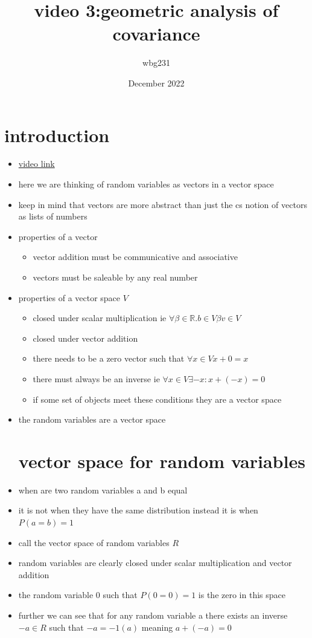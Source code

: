 \documentclass{article}
\title{video 3:geometric analysis of covariance }
\author{wbg231 }
\date{December 2022}
\begin{document}
\maketitle

\section{introduction}
\begin{itemize}
\item\href{https://www.youtube.com/watch?v=-sIvLCXcliE&t=298s}{video link}
\item here we are thinking of random variables as vectors in a vector space
\item keep in mind that vectors are more abstract than just the cs notion of vectors as lists of numbers
\item properties of a vector
\begin{itemize}
    \item vector addition must be communicative and associative
    \item vectors must be saleable by any real number
\end{itemize}
\item properties of a vector space $V$
\begin{itemize}
    \item closed under scalar multiplication ie $\forall \beta \in \mathbb{R}. b\in V \beta v\in V$
    \item closed under vector addition 
    \item there needs to be a zero vector such that $\forall x\in V x+0=x$
    \item there must always be an inverse ie $\forall x \in V \exists -x : x+(-x)=0$
    \item if some set of objects meet these conditions they are a vector space
\end{itemize}
\item the random variables are a vector space
\section{vector space for random variables}
\item when are two random variables a and b equal
\item it is not when they have the same distribution instead it is when $P(a=b)=1$
\item call the vector space of random variables $R$
\item random variables are clearly closed under scalar multiplication and vector addition 
\item the random variable 0 such that $P(0=0)=1$ is the zero in this space
\item further we can see that for any random variable a there exists an inverse $-a\in R$ such that $-a=-1(a)$ meaning $a+(-a)=0$

\end{itemize}
\end{document}
